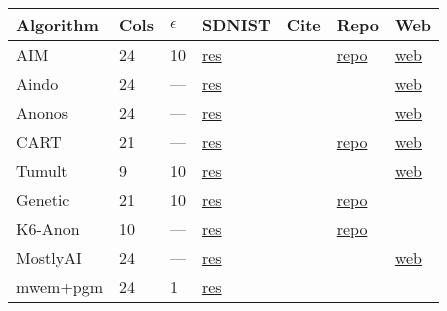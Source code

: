 \begin{table}
    \centering
    \begin{tabular}{lllllll}
        \toprule
        Algorithm & Cols & $\epsilon$ & SDNIST & Cite & Repo & Web \\
        \midrule
        AIM & 24 & 10 & \href{https://htmlpreview.github.io/?https://github.com/yoid2000/sdnist-summary/blob/main/results/aim_e_10_all/report.html}{res} & \cite{mckenna2022aim} & \href{https://github.com/opendp/smartnoise-sdk}{repo} & \href{https://opendp.org/}{web} \\
        Aindo & 24 & --- & \href{https://htmlpreview.github.io/?https://github.com/yoid2000/sdnist-summary/blob/main/results/aindo_synth/report.html}{res} &  &  & \href{https://www.aindo.com/}{web} \\
        Anonos & 24 & --- & \href{https://htmlpreview.github.io/?https://github.com/yoid2000/sdnist-summary/blob/main/results/anonos_sdk/report.html}{res} &  &  & \href{https://www.anonos.com/}{web} \\
        CART & 21 & --- & \href{https://htmlpreview.github.io/?https://github.com/yoid2000/sdnist-summary/blob/main/results/cart_cf21/report.html}{res} & \cite{nowok2016synthpop} & \href{https://CRAN.R-project.org/package=synthpop}{repo} & \href{https://synthpop.org.uk/}{web} \\
        Tumult & 9 & 10 & \href{https://htmlpreview.github.io/?https://github.com/yoid2000/sdnist-summary/blob/main/results/dphist_e_10_cf9/report.html}{res} &  &  & \href{https://www.tmlt.io/}{web} \\
        Genetic & 21 & 10 & \href{https://htmlpreview.github.io/?https://github.com/yoid2000/sdnist-summary/blob/main/results/genetic_sd_e_10_simple/report.html}{res} & \cite{liu2023generating} & \href{https://github.com/giusevtr/private_gsd}{repo} &  \\
        K6-Anon & 10 & --- & \href{https://htmlpreview.github.io/?https://github.com/yoid2000/sdnist-summary/blob/main/results/k_anonymity_k_6/report.html}{res} & \cite{templ2015statistical} & \href{https://github.com/sdcTools/sdcMicro}{repo} &  \\
        MostlyAI & 24 & --- & \href{https://htmlpreview.github.io/?https://github.com/yoid2000/sdnist-summary/blob/main/results/mostlyai_sd_platform/report.html}{res} &  &  & \href{https://mostly.ai/}{web} \\
        mwem+pgm & 24 & 1 & \href{https://htmlpreview.github.io/?https://github.com/yoid2000/sdnist-summary/blob/main/results/mwem_pgm/report.html}{res} & \cite{mckenna2019graphical} &  &  \\

\end{tabular}
\end{table}
